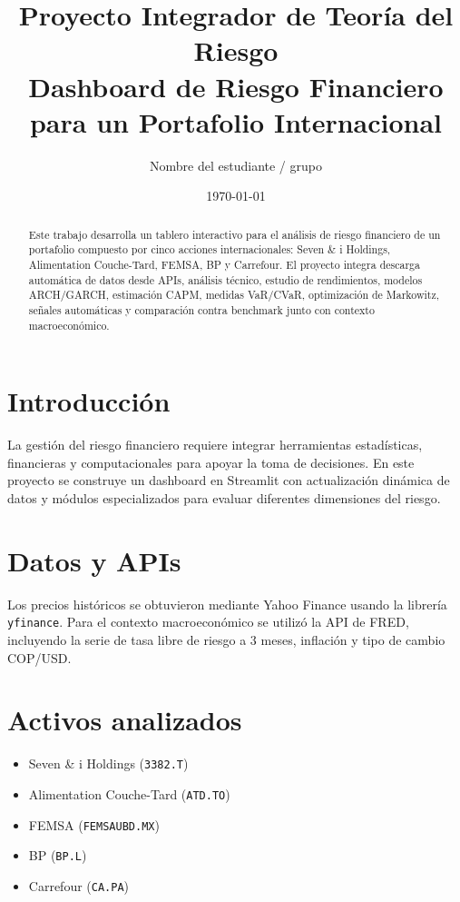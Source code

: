 \documentclass[11pt]{article}
\title{Proyecto Integrador de Teoría del Riesgo\\
Dashboard de Riesgo Financiero para un Portafolio Internacional}
\author{Nombre del estudiante / grupo}
\date{\today}
\begin{document}
\maketitle

\begin{abstract}
Este trabajo desarrolla un tablero interactivo para el análisis de riesgo financiero de un portafolio compuesto por cinco acciones internacionales: Seven \& i Holdings, Alimentation Couche-Tard, FEMSA, BP y Carrefour. El proyecto integra descarga automática de datos desde APIs, análisis técnico, estudio de rendimientos, modelos ARCH/GARCH, estimación CAPM, medidas VaR/CVaR, optimización de Markowitz, señales automáticas y comparación contra benchmark junto con contexto macroeconómico.
\end{abstract}

\section{Introducción}
La gestión del riesgo financiero requiere integrar herramientas estadísticas, financieras y computacionales para apoyar la toma de decisiones. En este proyecto se construye un dashboard en Streamlit con actualización dinámica de datos y módulos especializados para evaluar diferentes dimensiones del riesgo.

\section{Datos y APIs}
Los precios históricos se obtuvieron mediante Yahoo Finance usando la librería \texttt{yfinance}. Para el contexto macroeconómico se utilizó la API de FRED, incluyendo la serie de tasa libre de riesgo a 3 meses, inflación y tipo de cambio COP/USD.

\section{Activos analizados}
\begin{itemize}
    \item Seven \& i Holdings (\texttt{3382.T})
    \item Alimentation Couche-Tard (\texttt{ATD.TO})
    \item FEMSA (\texttt{FEMSAUBD.MX})
    \item BP (\texttt{BP.L})
    \item Carrefour (\texttt{CA.PA})
\end{itemize}
\end{document}
